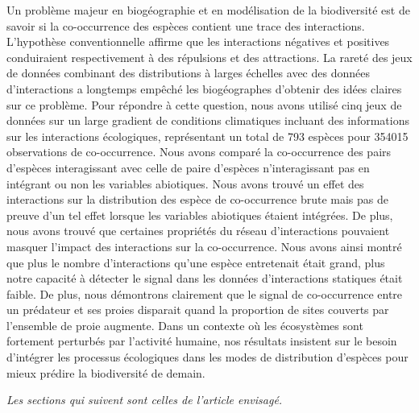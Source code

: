 Un problème majeur en biogéographie et en modélisation de la biodiversité
est de savoir si la co-occurrence des espèces contient une trace des
interactions. L'hypothèse conventionnelle affirme que les interactions
négatives et positives conduiraient respectivement à des répulsions et
des attractions. La rareté des jeux de données combinant des distributions
à larges échelles avec des données d'interactions a longtemps empêché
les biogéographes d'obtenir des idées claires sur ce problème. Pour répondre
à cette question, nous avons utilisé cinq jeux de données sur un large
gradient de conditions climatiques incluant des informations sur les interactions écologiques,
représentant un total de 793 espèces pour 354015 observations de co-occurrence.
Nous avons comparé la co-occurrence des pairs d'espèces interagissant avec
celle de paire d'espèces n'interagissant pas en intégrant ou non les
variables abiotiques. Nous avons trouvé un effet des interactions sur la
distribution des espèce de co-occurrence brute mais pas de preuve d'un tel
effet lorsque les variables abiotiques étaient intégrées. De plus, nous avons
trouvé que certaines propriétés du réseau d'interactions pouvaient masquer l'impact
des interactions sur la co-occurrence. Nous avons ainsi montré que plus le nombre
d'interactions qu'une espèce entretenait était grand, plus notre capacité
à détecter le signal dans les données d'interactions statiques était faible.
De plus, nous démontrons clairement que le signal de co-occurrence entre un
prédateur et ses proies disparait quand la proportion de sites couverts par
l'ensemble de proie augmente. Dans un contexte où les écosystèmes sont
fortement perturbés par l'activité humaine, nos résultats insistent
sur le besoin d'intégrer les processus écologiques dans les
modes de distribution d'espèces pour mieux prédire la biodiversité de demain.






\emph{Les sections qui suivent sont celles de l'article envisagé.}


\newpage
